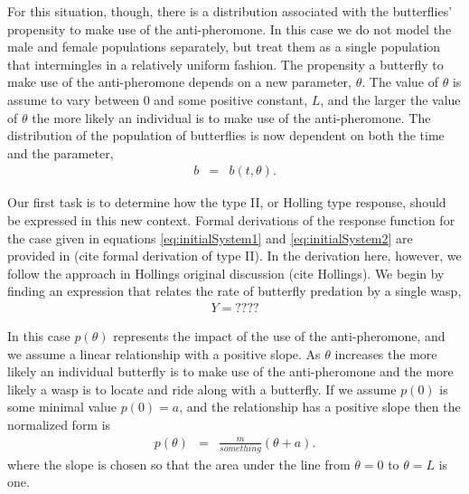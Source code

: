 \documentclass[12pt]{article}
\begin{document}
For this situation, though, there is a distribution associated with
the butterflies' propensity to make use of the anti-pheromone. In this
case we do not model the male and female populations separately, but
treat them as a single population that intermingles in a relatively
uniform fashion. The propensity a butterfly to make use of the
anti-pheromone depends on a new parameter, $\theta$. The value of
$\theta$ is assume to vary between $0$ and some positive constant,
$L$, and the larger the value of $\theta$ the more likely an
individual is to make use of the anti-pheromone. The distribution of
the population of butterflies is now dependent on both the time and
the parameter,
\begin{eqnarray}
  b & = & b(t,\theta).
\end{eqnarray}

Our first task is to determine how the type II, or Holling type
response, should be expressed in this new context. Formal derivations
of the response function for the case given in equations
\ref{eq:initialSystem1} and \ref{eq:initialSystem2} are provided in
(cite formal derivation of type II). In the derivation here, however,
we follow the approach in Hollings original discussion (cite
Hollings). We begin by finding an expression that relates the rate of
butterfly predation by a single wasp,
\begin{eqnarray}
  \label{eq:processingTime}
  Y = ????
\end{eqnarray}

In this case $p(\theta)$ represents the impact of the use of the
anti-pheromone, and we assume a linear relationship with a positive
slope. As $\theta$ increases the more likely an individual butterfly
is to make use of the anti-pheromone and the more likely a wasp is to
locate and ride along with a butterfly. If we assume $p(0)$ is some
minimal value $p(0)=a$, and the relationship has a positive slope then
the normalized form is
\begin{eqnarray}
  \label{eq:linearFormP}
  p(\theta) & = & \frac{m}{something} \left( \theta + a \right).
\end{eqnarray}
where the slope is chosen so that the area under the line from
$\theta=0$ to $\theta=L$ is one.
\end{document}
